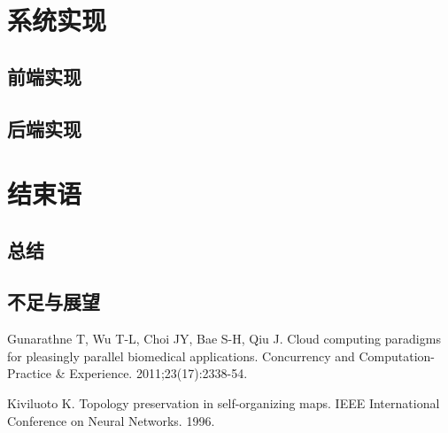 \documentclass[12pt]{article}
\begin{document}
\section{系统实现}
\subsection{前端实现}
\subsection{后端实现}

\section{结束语}
\subsection{总结}
\subsection{不足与展望}


\begin{thebibliography}{10}

Gunarathne T, Wu T-L, Choi JY, Bae S-H, Qiu J.
\newblock Cloud computing paradigms for pleasingly parallel biomedical applications.
\newblock Concurrency and Computation-Practice \& Experience. 2011;23(17):2338-54.

Kiviluoto K.
\newblock Topology preservation in self-organizing maps.
\newblock IEEE International Conference on Neural Networks. 1996.

\end{thebibliography}


%
\end{document}
